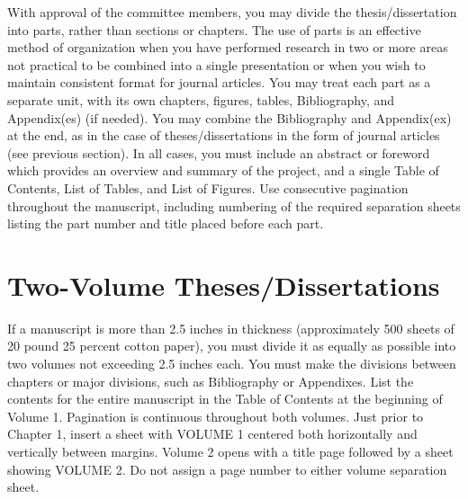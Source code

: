 With approval of the committee members, you may divide the
the\-sis/dis\-ser\-ta\-tion into parts, rather than sections or
chapters. The use of parts is an effective method of organization when
you have performed research in two or more areas not practical to be
combined into a single presentation or when you wish to maintain
consistent format for journal articles. You may treat each part as a
separate unit, with its own chapters, figures, tables, Bibliography,
and Appendix(es) (if needed). You may combine the Bibliography and
Appendix(ex) at the end, as in the case of
the\-ses/dis\-ser\-ta\-tions in the form of journal articles (see
previous section). In all cases, you must include an abstract or
foreword which provides an overview and summary of the project, and a
single Table of Contents, List of Tables, and List of Figures. Use
consecutive pagination throughout the manuscript, including numbering
of the required separation sheets listing the part number and title
placed before each part.

\section{Two-Volume Theses/Dissertations}
\label{sec:TwoVolumeThesesDissertations}

If a manuscript is more than 2.5 inches in thickness (approximately
500 sheets of 20 pound 25 percent cotton paper), you must divide it as
equally as possible into two volumes not exceeding 2.5 inches each.
You must make the divisions between chapters or major divisions, such
as Bibliography or Appendixes. List the contents for the entire
manuscript in the Table of Contents at the beginning of Volume 1.
Pagination is continuous throughout both volumes. Just prior to
Chapter 1, insert a sheet with VOLUME 1 centered both horizontally and
vertically between margins. Volume 2 opens with a title page followed
by a sheet showing VOLUME 2. Do not assign a page number to either
volume separation sheet.

